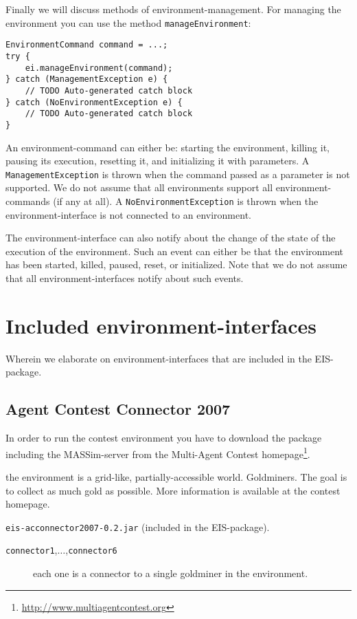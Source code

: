 \documentclass[a4]{article}
\newcommand{\EIS}{\textsf{EIS}\xspace}
\begin{document}
Finally we will discuss methods of environment-management. For managing the environment you can use
the method \texttt{manageEnvironment}:
\begin{verbatim}
EnvironmentCommand command = ...; 
try {
    ei.manageEnvironment(command);
} catch (ManagementException e) {
    // TODO Auto-generated catch block
} catch (NoEnvironmentException e) {
    // TODO Auto-generated catch block
}
\end{verbatim}
An environment-command can either be: starting the environment, killing it, pausing its execution, resetting it, and
initializing it with parameters. A \texttt{ManagementException} is thrown when the command passed as a parameter
is not supported. We do not assume that all environments support all environment-commands (if any at all). 
A \texttt{NoEnvironmentException} is thrown when the environment-interface is not connected to an environment.

The environment-interface can also notify about the change of the state of the execution of the environment.
Such an event can either be that the environment has been started, killed, paused, reset, or initialized.
Note that we do not assume that all environment-interfaces notify about such events.

\section{Included environment-interfaces}

Wherein we elaborate on environment-interfaces that are included in the \EIS-package.

\subsection{Agent Contest Connector 2007}

In order to run the contest environment you have to download the package including the MASSim-server from
the Multi-Agent Contest homepage\footnote{\url{http://www.multiagentcontest.org}}. 

\medskip{} the environment is a grid-like, partially-accessible world. Goldminers. The goal is to collect as much gold as possible. More information is available at the 
contest homepage.

\medskip{} \texttt{eis-acconnector2007-0.2.jar} (included in the \EIS-package).

\medskip{}
\begin{description}
\item[\texttt{connector1},$\ldots$,\texttt{connector6}] each one is a connector to a single goldminer in the environment.
\end{description}
\end{document}
